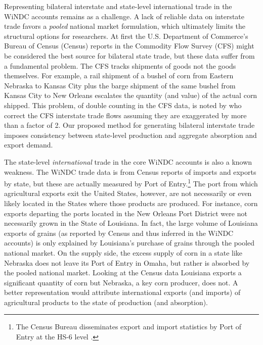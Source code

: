 \documentclass{ejb}
\begin{document}
Representing bilateral interstate and state-level international trade
in the WiNDC accounts remains as a challenge. A lack of reliable data 
on interstate trade favors a \emph{pooled} national market
formulation, which ultimately limits the structural options for
researchers.  At first the U.S. Department of Commerce's Bureau of
Census (Census) reports in the Commodity Flow Survey (CFS) might be
considered the best source for bilateral state trade, but these data
suffer from a fundamental problem.  The CFS tracks shipments of goods not
the goods themselves.  For example, a rail shipment of a bushel of
corn from Eastern Nebraska to Kansas City plus the barge shipment of the
same bushel from Kansas City to New Orleans escalates the quantity
(and value) of the actual corn shipped.  This problem, of double
counting in the CFS data, is noted by \citet{AvW} who
correct the CFS interstate trade flows assuming they are exaggerated
by more than a factor of 2.  Our proposed method for generating bilateral
interstate trade imposes consistency between state-level production
and aggregate absorption and export demand. 

The state-level \emph{international} trade in the core WiNDC accounts is also
a known weakness.  The WiNDC trade data is from Census
reports of imports and exports by state, but these are actually
measured by Port of Entry.\footnote{The Census Bureau 
	disseminates export and import statistics by Port of Entry at
	the HS-6 level \citep{Census}.}  
The port from which agricultural exports exit the United States,
however, are not necessarily or even likely located in the States where
those products are produced.  For instance, corn exports departing the
ports located in the New Orleans Port District were not necessarily
grown in the State of Louisiana.  In fact, the large volume of
Louisiana exports of grains (as reported by Census and thus inferred
in the WiNDC accounts) is only explained by Louisiana's purchase of
grains through the pooled national market.  On the supply side, the
excess supply of corn in a state like Nebraska does not leave its Port
of Entry in Omaha, but rather is absorbed by the pooled national
market.  Looking at the Census data Louisiana exports a significant
quantity of corn but Nebraska, a key corn producer, does not.  A
better representation would attribute international exports (and
imports) of agricultural products to the state of production (and
absorption).  
 
\end{document}
